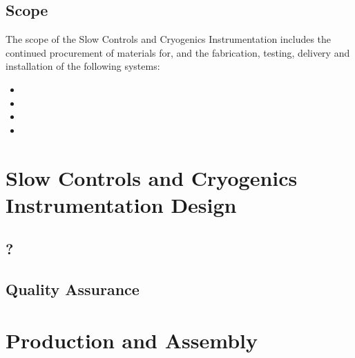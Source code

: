 

\subsection{Scope}
\label{sec:fdsp-slow-cryo-scope}

The scope of the Slow Controls and Cryogenics Instrumentation includes the continued procurement of materials for, and the fabrication, testing, delivery and installation of the following systems: 


\begin{itemize}
\item 
\item 
\item  
\item 
\end{itemize}



\section{Slow Controls and Cryogenics Instrumentation Design}
\label{sec:fdsp-slow-cryo-design}




\subsection{?}
\label{sec:fdsp-slow-cryo-?}




\subsection{Quality Assurance}
\label{sec:fdsp-slow-cryo-qa}




\section{Production and Assembly}
\label{sec:fdsp-slow-cryo-prod-assy}

